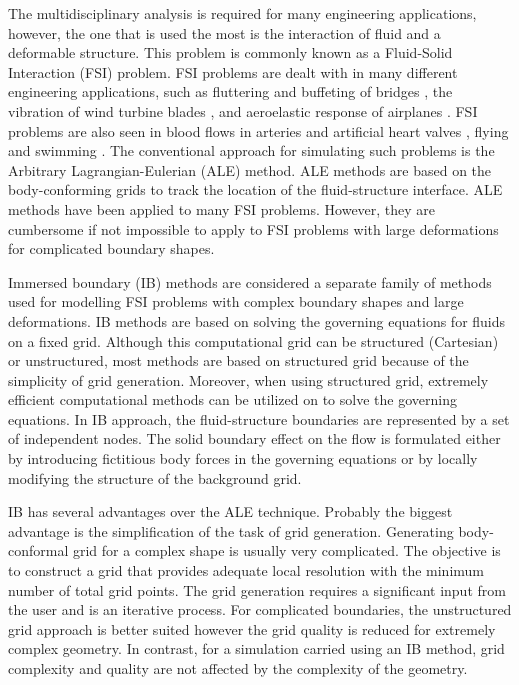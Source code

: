 The multidisciplinary analysis is required for many engineering applications, however, the one that is used the most is the interaction of fluid and a deformable structure. This problem is commonly known as a Fluid-Solid Interaction (FSI) problem. FSI problems are dealt with in many different engineering applications, such as fluttering and buffeting of bridges \cite{jain1996coupled}, the vibration of wind turbine blades \cite{arrigan2011control}, and aeroelastic response of airplanes \cite{farhat2006provably}. FSI problems are also seen in blood flows in arteries and artificial heart valves \cite{sotiropoulos2009review}, flying and swimming \cite{kern2006simulations}. The conventional approach for simulating such problems is the Arbitrary Lagrangian-Eulerian (ALE) method. ALE methods are based on the body-conforming grids to track the location of the fluid-structure interface. ALE methods have been applied to many FSI problems. However, they are cumbersome if not impossible to apply to FSI problems with large deformations for complicated boundary shapes.

Immersed boundary (IB) methods are considered a separate family of methods used for modelling FSI problems with complex boundary shapes and large deformations. IB methods are based on solving the governing equations for fluids on a fixed grid. Although this computational grid can be structured (Cartesian) or unstructured, most methods are based on structured grid because of the simplicity of grid generation. Moreover, when using structured grid, extremely efficient computational methods can be utilized on to solve the governing equations. In IB approach, the fluid-structure boundaries are represented by a set of independent nodes. The solid boundary effect on the flow is formulated either by introducing fictitious body forces in the governing equations or by locally modifying the structure of the background grid.

IB has several advantages over the ALE technique. Probably the biggest advantage is the simplification of the task of grid generation. Generating body-conformal grid for a complex shape is usually very complicated. The objective is to construct a grid that provides adequate local resolution with the minimum number of total grid points.  The grid generation requires a significant input from the user and is an iterative process. For complicated boundaries, the unstructured grid approach is better suited however the grid quality is reduced for extremely complex geometry. In contrast, for a simulation carried using an IB method, grid complexity and quality are not affected by the complexity of the geometry. 

